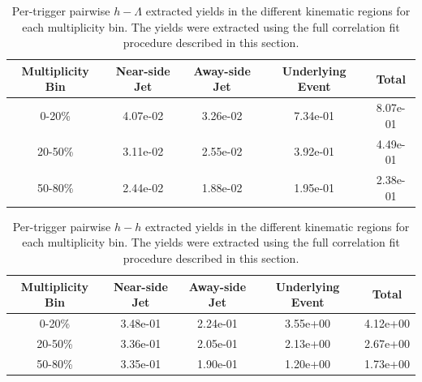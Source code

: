 \documentclass[ALICE,manyauthors]{ALICE_analysis_notes}
\begin{document}
\begin{table}[h!]
\centering
\begin{tabular}{| c | c | c | c | c | }
\hline
Multiplicity Bin & Near-side Jet & Away-side Jet & Underlying Event & Total  \\
\hline
	
0-20\% & 4.07e-02  & 3.26e-02  & 7.34e-01 & 8.07e-01 \\
20-50\% & 3.11e-02 & 2.55e-02  & 3.92e-01 & 4.49e-01 \\
50-80\% & 2.44e-02 & 1.88e-02  & 1.95e-01 & 2.38e-01 \\
	
\hline
\end{tabular}
\caption{Per-trigger pairwise $h-\Lambda$ extracted yields in the different kinematic regions for each multiplicity bin. The yields were extracted using the full correlation fit procedure described in this section.}
\label{h_lambda_yield_table_fullfit}
\end{table}
	
\begin{table}[h!]
\centering
\begin{tabular}{| c | c | c | c | c | }
\hline
Multiplicity Bin & Near-side Jet & Away-side Jet & Underlying Event & Total  \\
\hline

0-20\% & 3.48e-01  & 2.24e-01  & 3.55e+00 & 4.12e+00 \\
20-50\% & 3.36e-01 & 2.05e-01  & 2.13e+00 & 2.67e+00 \\
50-80\% & 3.35e-01 & 1.90e-01  & 1.20e+00 & 1.73e+00 \\

\hline
\end{tabular}
\caption{Per-trigger pairwise $h-h$ extracted yields in the different kinematic regions for each multiplicity bin. The yields were extracted using the full correlation fit procedure described in this section.}
\label{h_h_yield_table_fullfit}
\end{table}

\clearpage
\end{document}
